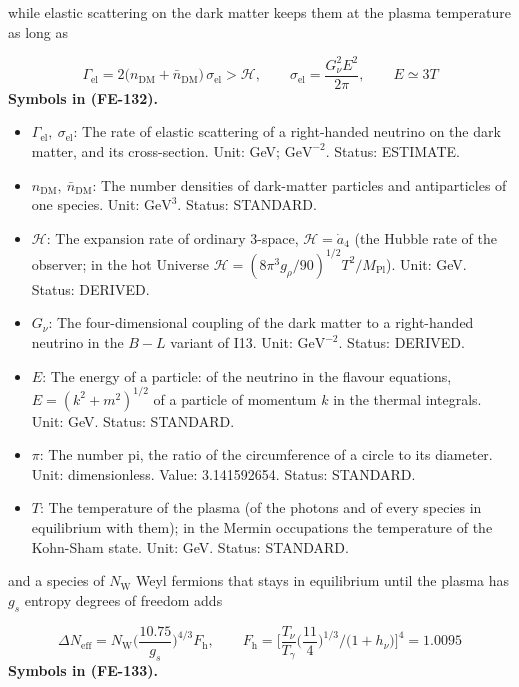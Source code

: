 \documentclass[
  10pt,
]{article}
\providecommand{\tightlist}{%
  \setlength{\itemsep}{0pt}\setlength{\parskip}{0pt}}
\begin{document}
while elastic scattering on the dark matter keeps them at the plasma
temperature as long as

\[
\Gamma_{\mathrm{el}} = 2\big(n_{\mathrm{DM}} + \bar n_{\mathrm{DM}}\big)\,\sigma_{\mathrm{el}} >
 \mathcal{H},\qquad
\sigma_{\mathrm{el}} = \frac{G_\nu^2E^2}{2\pi},\qquad E \simeq 3T \tag{FE-132}
\] \textbf{Symbols in (FE-132).}

\begin{itemize}
\tightlist
\item
  \(\Gamma_{\mathrm{el}},\ \sigma_{\mathrm{el}}\): The rate of elastic
  scattering of a right-handed neutrino on the dark matter, and its
  cross-section. Unit: GeV; \(\mathrm{GeV}^{-2}\). Status: ESTIMATE.
\item
  \(n_{\mathrm{DM}},\ \bar n_{\mathrm{DM}}\): The number densities of
  dark-matter particles and antiparticles of one species. Unit:
  \(\mathrm{GeV}^{3}\). Status: STANDARD.
\item
  \(\mathcal{H}\): The expansion rate of ordinary 3-space,
  \(\mathcal{H} = \dot a_4\) (the Hubble rate of the observer; in the
  hot Universe
  \(\mathcal{H} = (8\pi^3g_\rho/90)^{1/2}T^2/M_{\mathrm{Pl}}\)). Unit:
  GeV. Status: DERIVED.
\item
  \(G_\nu\): The four-dimensional coupling of the dark matter to a
  right-handed neutrino in the \(B - L\) variant of I13. Unit:
  \(\mathrm{GeV}^{-2}\). Status: DERIVED.
\item
  \(E\): The energy of a particle: of the neutrino in the flavour
  equations, \(E = (k^2 + m^2)^{1/2}\) of a particle of momentum \(k\)
  in the thermal integrals. Unit: GeV. Status: STANDARD.
\item
  \(\pi\): The number pi, the ratio of the circumference of a circle to
  its diameter. Unit: dimensionless. Value: 3.141592654. Status:
  STANDARD.
\item
  \(T\): The temperature of the plasma (of the photons and of every
  species in equilibrium with them); in the Mermin occupations the
  temperature of the Kohn-Sham state. Unit: GeV. Status: STANDARD.
\end{itemize}

and a species of \(N_{\mathrm{W}}\) Weyl fermions that stays in
equilibrium until the plasma has \(g_s\) entropy degrees of freedom adds

\[
\Delta N_{\mathrm{eff}} = N_{\mathrm{W}}\Big(\frac{10.75}{g_s}\Big)^{4/3}F_{\mathrm{h}},\qquad
F_{\mathrm{h}} = \Big[\frac{T_\nu}{T_\gamma}\Big(\frac{11}{4}\Big)^{1/3}\Big/\big(1 + h_\nu\big)\Big]^4
 = 1.0095 \tag{FE-133}
\] \textbf{Symbols in (FE-133).}
\end{document}
